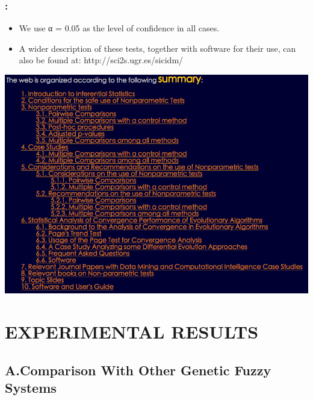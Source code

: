 \documentclass{beamer}
\begin{document}
\begin{CJK*}{UTF8}{bsmi}
\begin{frame}
	\frametitle{\insertsection : \insertsubsection}
	\begin{itemize}
			\item We use α = 0.05 as the level of confidence in all cases. 
			\item A wider description of these tests, together with software for their use, can also be found at: http://sci2s.ugr.es/sicidm/
	\end{itemize}
	\begin{center}
				\includegraphics[height=.7\textheight]{./11.png}
	\end{center}
\end{frame}
	


\section{EXPERIMENTAL RESULTS}
\subsection{A.Comparison With Other Genetic Fuzzy Systems}



\end{CJK*}
\end{document}
